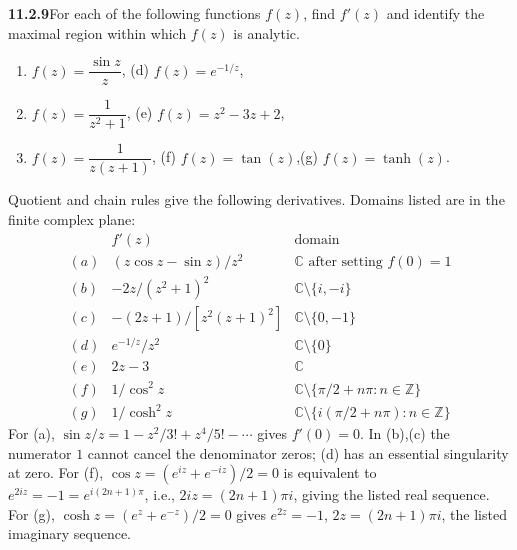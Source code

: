 \par\bigskip
\noindent\textbf{11.2.9}\quad For each of the following functions $f(z)$, find
$f'(z)$ and identify the maximal region within which $f(z)$ is analytic.
\begin{enumerate}
\item[(a)] $f(z)=\dfrac{\sin z}{z}$,\qquad
(d) $f(z)=e^{-1/z}$,
\item[(b)] $f(z)=\dfrac{1}{z^{2}+1}$,\qquad
(e) $f(z)=z^{2}-3z+2$,
\item[(c)] $f(z)=\dfrac{1}{z(z+1)}$,\qquad
(f) $f(z)=\tan(z)$,\qquad (g) $f(z)=\tanh(z)$.
\end{enumerate}
\solution
Quotient and chain rules give the following derivatives. Domains
listed are in the finite complex plane:
\[
\begin{array}{c|c|l}
 &f'(z)&\text{domain}\\ \hline
(a)&(z\cos z-\sin z)/z^2&\mathbb C\text{ after setting }f(0)=1\\
(b)&-2z/(z^2+1)^2&\mathbb C\setminus\{i,-i\}\\
(c)&-(2z+1)/[z^2(z+1)^2]&\mathbb C\setminus\{0,-1\}\\
(d)&e^{-1/z}/z^2&\mathbb C\setminus\{0\}\\
(e)&2z-3&\mathbb C\\
(f)&1/\cos^2z&\mathbb C\setminus\{\pi/2+n\pi:n\in\mathbb Z\}\\
(g)&1/\cosh^2z&\mathbb C\setminus\{i(\pi/2+n\pi):n\in\mathbb Z\}
\end{array}
\]
For (a), $\sin z/z=1-z^2/3!+z^4/5!-\cdots$ gives $f'(0)=0$.
In (b),(c) the numerator $1$ cannot cancel the denominator zeros; (d)
has an essential singularity at zero. For (f),
$\cos z=(e^{iz}+e^{-iz})/2=0$ is equivalent to
$e^{2iz}=-1=e^{i(2n+1)\pi}$, i.e., $2iz=(2n+1)\pi i$, giving the
listed real sequence. For (g), $\cosh z=(e^z+e^{-z})/2=0$ gives
$e^{2z}=-1$, $2z=(2n+1)\pi i$, the listed imaginary sequence.

